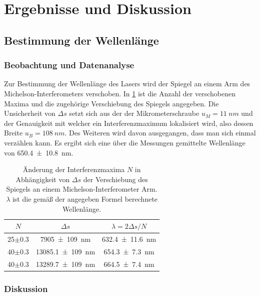 \documentclass[
	a4paper,
	12pt,
	pagesize,
	ngerman
]{scrartcl}
\begin{document}
	\section{Ergebnisse und Diskussion}


	\subsection{Bestimmung der Wellenlänge}
	\subsubsection{Beobachtung und Datenanalyse}
	Zur Bestimmung der Wellenlänge des Lasers wird der Spiegel an einem Arm des Michelson-Interferometers verschoben.
	In \cref{tb_lambda} ist die Anzahl der verschobenen Maxima und die zugehörige Verschiebung des Spiegels angegeben. %
	Die Unsicherheit von $\Delta s$ setzt sich aus der der Mikrometerschraube $u_M=\SI{11}{nm}$ und der Genauigkeit mit welcher ein Interferenzmaximum lokalisiert wird, also dessen Breite $u_B=\SI{108}{nm}$. %
	Des Weiteren wird davon ausgegangen, dass man sich einmal verzählen kann.
	Es ergibt sich eine über die Messungen gemittelte Wellenlänge von \SI{650.4+-10.8}{nm}.

	\begin{table}[H]
		\centering
		\begin{tabular}{| c | c | c |}
			\hline
			  $N$ &  $\Delta s$ & $\lambda=2 \Delta s/N$\\ \hline
				25$\pm$0.3 & \SI{7905+-109}{nm} & \SI{632.4+-11.6}{nm}\\
				40$\pm$0.3& \SI{13085.1+-109}{nm} & \SI{654.3+-7.3}{nm}\\
				40$\pm$0.3& \SI{13289.7+-109}{nm} & \SI{664.5+-7.4}{nm}\\
				\hline
		\end{tabular}
		\caption{Änderung der Interferenzmaxima $N$ in Abhängigkeit von $\Delta s$ der Verschiebung des Spiegels an einem Michelson-Interferometer Arm. $\lambda$ ist die gemäß der angegeben Formel berechnete Wellenlänge. } %
		\label{tb_lambda}
	\end{table}

	\subsubsection{Diskussion}
\end{document}
